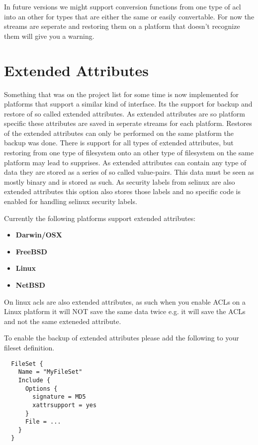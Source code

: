 In future versions we might support conversion functions from one type of acl
into an other for types that are either the same or easily convertable. For now
the streams are seperate and restoring them on a platform that doesn't
recognize them will give you a warning.

\section{Extended Attributes}
Something that was on the project list for some time is now implemented for
platforms that support a similar kind of interface. Its the support for backup
and restore of so called extended attributes. As extended attributes are so
platform specific these attributes are saved in seperate streams for each
platform.  Restores of the extended attributes can only be performed on the
same platform the backup was done.  There is support for all types of extended
attributes, but restoring from one type of filesystem onto an other type of
filesystem on the same platform may lead to supprises.  As extended attributes
can contain any type of data they are stored as a series of so called
value-pairs.  This data must be seen as mostly binary and is stored as such.
As security labels from selinux are also extended attributes this option also
stores those labels and no specific code is enabled for handling selinux
security labels.

Currently the following platforms support extended attributes:
\begin{itemize}
 \item {\bf Darwin/OSX}
 \item {\bf FreeBSD}
 \item {\bf Linux}
 \item {\bf NetBSD}
\end{itemize}

On linux acls are also extended attributes, as such when you enable ACLs on a
Linux platform it will NOT save the same data twice e.g. it will save the ACLs
and not the same exteneded attribute.

To enable the backup of extended attributes please add the following to your
fileset definition.
\begin{verbatim}
  FileSet {
    Name = "MyFileSet"
    Include {
      Options {
        signature = MD5
        xattrsupport = yes
      }
      File = ...
    }
  }
\end{verbatim}

